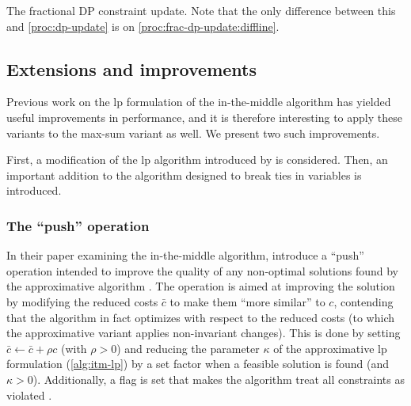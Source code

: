 \begin{algorithm}[tbp]
	
	\caption{
		The fractional DP constraint update. Note that the only difference between this and \cref{proc:dp-update} is on \cref{proc:frac-dp-update:diffline}.
	}
	\label{proc:frac-dp-update}
\end{algorithm}

\subsection{Extensions and improvements}
Previous work on the \gls{lp} formulation of the in-the-middle algorithm has yielded useful improvements in performance, and it is therefore interesting to apply these variants to the max-sum variant as well.
We present two such improvements.

First, a modification of the \gls{lp} algorithm introduced by \textcite{Bastert10} is considered.
Then, an important addition to the algorithm designed to break ties in variables is introduced.

\subsubsection{The \enquote{push} operation}
In their paper examining the in-the-middle algorithm, \textcite{Bastert10} introduce a \enquote{push} operation intended to improve the quality of any non-optimal solutions found by the approximative algorithm \parencite[\pno~99\psq]{Bastert10}.
The operation is aimed at improving the solution by modifying the reduced costs \(\bar{c}\) to make them \enquote{more similar} to \(c\), contending that the algorithm in fact optimizes with respect to the reduced costs (to which the approximative variant applies non-invariant changes).
This is done by setting \(\bar{c}\leftarrow\bar{c}+\rho c\) (with \(\rho>0\)) and reducing the parameter \(\kappa\) of the approximative \gls{lp} formulation (\cref{alg:itm-lp}) by a set factor when a feasible solution is found (and \(\kappa>0\)).
Additionally, a flag is set that makes the algorithm treat all constraints as violated \parencite[\pno~100]{Bastert10}.


